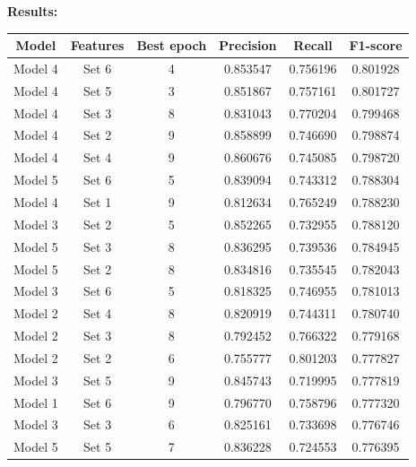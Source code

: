 \textbf{Results:}
\begin{table}[htbp]
    \centering
    \small
    \begin{tabular}{c|c|c|c|c|c}
        \textbf{Model} & \textbf{Features} & \textbf{Best epoch} & \textbf{Precision} & \textbf{Recall} & \textbf{F1-score} \\ \hline
        Model 4    &	Set 6	    &   4      &      0.853547     &	0.756196    &	0.801928  \\
        Model 4    &	Set 5	    &   3      &      0.851867     &	0.757161    &	0.801727  \\
        Model 4    &	Set 3	    &   8      &      0.831043     &	0.770204    &	0.799468  \\
        Model 4    &	Set 2	    &   9      &      0.858899     &	0.746690    &	0.798874  \\
        Model 4    &	Set 4	    &   9      &      0.860676     &	0.745085    &	0.798720  \\
        Model 5    &	Set 6	    &   5      &      0.839094     &	0.743312    &	0.788304  \\
        Model 4    &	Set 1	    &   9      &      0.812634     &	0.765249    &	0.788230  \\
        Model 3    &	Set 2	    &   5      &      0.852265     &	0.732955    &	0.788120  \\
        Model 5    &	Set 3	    &   8      &      0.836295     &	0.739536    &	0.784945  \\
        Model 5    &	Set 2	    &   8      &      0.834816     &	0.735545    &	0.782043  \\
        Model 3    &	Set 6	    &   5      &      0.818325     &	0.746955    &	0.781013  \\
        Model 2    &	Set 4	    &   8      &      0.820919     &	0.744311    &	0.780740  \\
        Model 2    &	Set 3	    &   8      &      0.792452     &	0.766322    &	0.779168  \\
        Model 2    &	Set 2	    &   6      &      0.755777     &	0.801203    &	0.777827  \\
        Model 3    &	Set 5	    &   9      &      0.845743     &	0.719995    &	0.777819  \\
        Model 1    &	Set 6	    &   9      &      0.796770     &	0.758796    &	0.777320  \\
        Model 3    &	Set 3	    &   6      &      0.825161     &	0.733698    &	0.776746  \\
        Model 5    &	Set 5	    &   7      &      0.836228     &	0.724553    &	0.776395  \\

\end{tabular}
\end{table}
